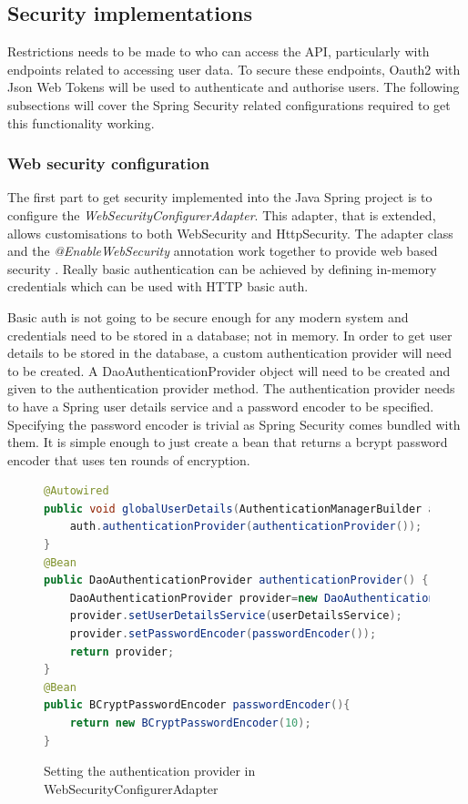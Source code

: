 \clearpage
\subsection{Security implementations}

Restrictions needs to be made to who can access the API, particularly with endpoints related to accessing user data.
To secure these endpoints, Oauth2 with Json Web Tokens will be used to authenticate and authorise users.
The following subsections will cover the Spring Security related configurations required to get this functionality working.




\subsubsection{Web security configuration}
The first part to get security implemented into the Java Spring project is to configure the \textit{WebSecurityConfigurerAdapter}.
This adapter, that is extended, allows customisations to both WebSecurity and HttpSecurity.
The adapter class and the \textit{@EnableWebSecurity} annotation work together to provide web based security \cite{winch2013springsecurity}.
Really basic authentication can be achieved by defining in-memory credentials which can be used with HTTP basic auth.

Basic auth is not going to be secure enough for any modern system and credentials need to be stored in a database; not in memory.
In order to get user details to be stored in the database, a custom authentication provider will need to be created.
A DaoAuthenticationProvider object will need to be created and given to the authentication provider method.
The authentication provider needs to have a Spring user details service and a password encoder to be specified.
Specifying the password encoder is trivial as Spring Security comes bundled with them. 
It is simple enough to just create a bean that returns a bcrypt password encoder that uses ten rounds of encryption.


\begin{figure}[ht]
    \centering
    \begin{lstlisting}[language=Java]
@Autowired
public void globalUserDetails(AuthenticationManagerBuilder auth) {
    auth.authenticationProvider(authenticationProvider());
}
@Bean
public DaoAuthenticationProvider authenticationProvider() {
    DaoAuthenticationProvider provider=new DaoAuthenticationProvider();
    provider.setUserDetailsService(userDetailsService);
    provider.setPasswordEncoder(passwordEncoder());
    return provider;
}       
@Bean
public BCryptPasswordEncoder passwordEncoder(){
    return new BCryptPasswordEncoder(10);
}
    \end{lstlisting}
    \caption{Setting the authentication provider in WebSecurityConfigurerAdapter}
    \label{settingauthprovider}
\end{figure}

